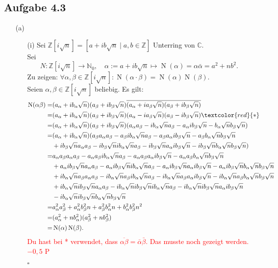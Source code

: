 \documentclass[12pt]{article}
\newcommand{\corr}[1]{\textcolor{red}{#1}}
\newcommand{\QED}{\begin{flushright} $\square$ \end{flushright}}
\newcommand{\N}{\operatorname{N}}
\newcommand{\aal}{a_{\alpha}}
\newcommand{\ab}{a_{\beta}}
\newcommand{\ba}{b_{\alpha}}
\newcommand{\bb}{b_{\beta}}
\begin{document}
\subsection*{Aufgabe 4.3}
\begin{enumerate}
	\item[(a)] 
	\begin{enumerate}
		\item[(i)] Sei $\mathbb{Z}[i\sqrt{n}]=\left\lbrack a+ib\sqrt{n}\mid a,b\in\mathbb{Z}\right\rbrack$ Unterring von $\mathbb{C}$. \\
		Sei $$N:\mathbb{Z}[i\sqrt{n}]\rightarrow\mathbb{N}_0, \quad
		\alpha:=a+ib\sqrt{n}\mapsto \N(\alpha)=\alpha\bar{\alpha}=a^2+nb^2.$$
		Zu zeigen: $\forall\alpha,\beta\in\mathbb{Z}[i\sqrt{n}]:\N(\alpha\cdot\beta)=\N(\alpha)\N(\beta).$ \\
		Seien $\alpha,\beta\in\mathbb{Z}[i\sqrt{n}]$ beliebig. Es gilt:
		\begin{align*}
			\N(\alpha\beta)=&(\aal+i\ba\sqrt{n})(\ab+i\bb\sqrt{n})\overline{(\aal+i\ab\sqrt{n})(\ab+i\bb\sqrt{n})} \\
			=&(\aal+i\ba\sqrt{n})(\ab+i\bb\sqrt{n})(\aal-i\ab\sqrt{n})(\ab-i\bb\sqrt{n}) \corr{*} \\
			=&(\aal+i\ba\sqrt{n})(\ab+i\bb\sqrt{n})(\aal\ab-i\ba\sqrt{n}\ab-\aal i\bb\sqrt{n}-\ba\sqrt{n}\bb\sqrt{n}) \\
			=&(\aal+i\ba\sqrt{n})(\ab\aal\ab-\ab i\ba\sqrt{n}\ab-\ab\aal i\bb\sqrt{n}-\ab\ba\sqrt{n}\bb\sqrt{n} \\
			&+i\bb\sqrt{n}\aal\ab-i\bb\sqrt{n}i\ba\sqrt{n}\ab-i\bb\sqrt{n}\aal i\bb\sqrt{n}-i\bb\sqrt{n}\ba\sqrt{n}\bb\sqrt{n}) \\
			=&\aal\ab\aal\ab-\aal\ab i\ba\sqrt{n}\ab-\aal\ab\aal i\bb\sqrt{n}-\aal\ab\ba\sqrt{n}\bb\sqrt{n} \\
			&+\aal i\bb\sqrt{n}\aal\ab-\aal i\bb\sqrt{n}i\ba\sqrt{n}\ab-\aal i\bb\sqrt{n}\aal i\bb\sqrt{n}-\aal i\bb\sqrt{n}\ba\sqrt{n}\bb\sqrt{n} \\		
			&+i\ba\sqrt{n}\ab\aal\ab-i\ba\sqrt{n}\ab i\ba\sqrt{n}\ab-i\ba\sqrt{n}\ab\aal i\bb\sqrt{n}-i\ba\sqrt{n}\ab\ba\sqrt{n}\bb\sqrt{n} \\
			&+i\ba\sqrt{n}i\bb\sqrt{n}\aal\ab-i\ba\sqrt{n}i\bb\sqrt{n}i\ba\sqrt{n}\ab-i\ba\sqrt{n}i\bb\sqrt{n}\aal i\bb\sqrt{n} \\
			&-i\ba\sqrt{n}i\bb\sqrt{n}\ba\sqrt{n}\bb\sqrt{n} \\
			=&\aal^2\ab^2+\aal^2\bb^2n+\ab^2\ba^2n+\ba^2\bb^2n^2 \\
			=&(\aal^2+n\ba^2)(\ab^2+n\bb^2) \\
			=&\N(\alpha)\N(\beta).
		\end{align*}
\corr{Du hast bei * verwendet, dass $\overline{\alpha \beta}=\bar{\alpha}\bar{\beta}$. Das musste noch gezeigt werden. $-0,5$ P}
		\QED
		

\end{enumerate}
\end{enumerate}
\end{document}
